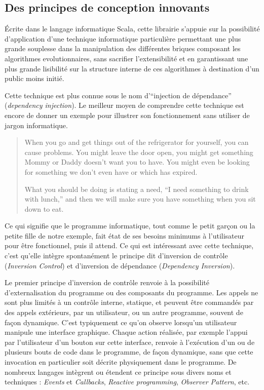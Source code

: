 \subsection{Des principes de conception innovants}

Écrite dans le langage informatique Scala, cette librairie s'appuie sur la possibilité d'application d'une technique informatique particulière permettant une plus grande souplesse dans la manipulation des différentes briques composant les algorithmes evolutionnaires, sans sacrifier l'extensibilité et en garantissant une plus grande lisibilité sur la structure interne de ces algorithmes à destination d'un public moins initié.

Cette technique est plus connue sous le nom d'\enquote{injection de dépendance} (\textit{dependency injection}). Le meilleur moyen de comprendre cette technique est encore de donner un exemple pour illustrer son fonctionnement sans utiliser de jargon informatique.

\foreignblockquote{english}[\cite{Seemann2011}]{When you go and get things out of the refrigerator for yourself, you can cause problems. You might leave the door open, you might get something Mommy or Daddy doesn't want you to have. You might even be looking for something we don't even have or which has expired.

What you should be doing is stating a need, \enquote{I need something to drink with lunch,} and then we will make sure you have something when you sit down to eat.}

Ce qui signifie que le programme informatique, tout comme le petit garçon ou la petite fille de notre exemple, fait état de ses besoins minimums à l'utilisateur pour être fonctionnel, puis il attend. Ce qui est intéressant avec cette technique, c'est qu'elle intègre spontanément le principe dit d'inversion de contrôle (\textit{Inversion Control}) et d'inversion de dépendance (\textit{Dependency Inversion}).

Le premier principe d'inversion de contrôle renvoie à la possibilité d'externalisation du programme ou des composants du programme. Les appels ne sont plus limités à un contrôle interne, statique, et peuvent être commandés par des appels extérieurs, par un utilisateur, ou un autre programme, souvent de façon dynamique. C'est typiquement ce qu'on observe lorsqu'un utilisateur manipule une interface graphique. Chaque action réalisée, par exemple l'appui par l'utilisateur d'un bouton sur cette interface, renvoie à l'exécution d'un ou de plusieurs bouts de code dans le programme, de façon dynamique, sans que cette invocation en particulier soit décrite physiquement dans le programme. De nombreux langages intègrent ou étendent ce principe sous divers noms et techniques : \textit{Events} et \textit{Callbacks}, \textit{Reactive programming}, \textit{Observer Pattern}, etc.

